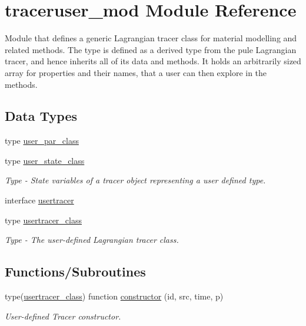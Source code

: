 \hypertarget{namespacetraceruser__mod}{}\section{traceruser\+\_\+mod Module Reference}
\label{namespacetraceruser__mod}


Module that defines a generic Lagrangian tracer class for material modelling and related methods. The type is defined as a derived type from the pule Lagrangian tracer, and hence inherits all of it\textquotesingle{}s data and methods. It holds an arbitrarily sized array for properties and their names, that a user can then explore in the methods.  


\subsection*{Data Types}
\begin{DoxyCompactItemize}
\item 
type \mbox{\hyperlink{structtraceruser__mod_1_1user__par__class}{user\+\_\+par\+\_\+class}}
\item 
type \mbox{\hyperlink{structtraceruser__mod_1_1user__state__class}{user\+\_\+state\+\_\+class}}
\begin{DoxyCompactList}\small\item\em Type -\/ State variables of a tracer object representing a user defined type. \end{DoxyCompactList}\item 
interface \mbox{\hyperlink{interfacetraceruser__mod_1_1usertracer}{usertracer}}
\item 
type \mbox{\hyperlink{structtraceruser__mod_1_1usertracer__class}{usertracer\+\_\+class}}
\begin{DoxyCompactList}\small\item\em Type -\/ The user-\/defined Lagrangian tracer class. \end{DoxyCompactList}\end{DoxyCompactItemize}
\subsection*{Functions/\+Subroutines}
\begin{DoxyCompactItemize}
\item 
type(\mbox{\hyperlink{structtraceruser__mod_1_1usertracer__class}{usertracer\+\_\+class}}) function \mbox{\hyperlink{namespacetraceruser__mod_a9b5d52bbc9611921275ff35fa82a91c5}{constructor}} (id, src, time, p)
\begin{DoxyCompactList}\small\item\em User-\/defined Tracer constructor. \end{DoxyCompactList}\end{DoxyCompactItemize}


